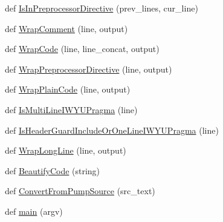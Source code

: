 \begin{DoxyCompactItemize}
\item 
def \mbox{\hyperlink{namespacegoogletest-master_1_1googletest_1_1scripts_1_1pump_ab5f2255303d60f6b7b5b4d2512c588be}{Is\+In\+Preprocessor\+Directive}} (prev\+\_\+lines, cur\+\_\+line)
\item 
def \mbox{\hyperlink{namespacegoogletest-master_1_1googletest_1_1scripts_1_1pump_a4b20aced378c37e54acb7d5aff578c4d}{Wrap\+Comment}} (line, output)
\item 
def \mbox{\hyperlink{namespacegoogletest-master_1_1googletest_1_1scripts_1_1pump_a7f71749d88261af88a8458ef0d4644d5}{Wrap\+Code}} (line, line\+\_\+concat, output)
\item 
def \mbox{\hyperlink{namespacegoogletest-master_1_1googletest_1_1scripts_1_1pump_a0b2798bac4eb00d18ba9984569a19793}{Wrap\+Preprocessor\+Directive}} (line, output)
\item 
def \mbox{\hyperlink{namespacegoogletest-master_1_1googletest_1_1scripts_1_1pump_a442d8c63e9bfec53e0802ae7ee4c2516}{Wrap\+Plain\+Code}} (line, output)
\item 
def \mbox{\hyperlink{namespacegoogletest-master_1_1googletest_1_1scripts_1_1pump_aafe6ed37e1501cfcc2a4c6189d77b382}{Is\+Multi\+Line\+I\+W\+Y\+U\+Pragma}} (line)
\item 
def \mbox{\hyperlink{namespacegoogletest-master_1_1googletest_1_1scripts_1_1pump_afd21629e499fb8ba3108318ff7bb6555}{Is\+Header\+Guard\+Include\+Or\+One\+Line\+I\+W\+Y\+U\+Pragma}} (line)
\item 
def \mbox{\hyperlink{namespacegoogletest-master_1_1googletest_1_1scripts_1_1pump_abc972428be28e7de22c3e8b860e1058b}{Wrap\+Long\+Line}} (line, output)
\item 
def \mbox{\hyperlink{namespacegoogletest-master_1_1googletest_1_1scripts_1_1pump_ace5c606a1b5b7e11c1ea00921021b461}{Beautify\+Code}} (string)
\item 
def \mbox{\hyperlink{namespacegoogletest-master_1_1googletest_1_1scripts_1_1pump_aa5b7fd91e17856b15706074ec13699a0}{Convert\+From\+Pump\+Source}} (src\+\_\+text)
\item 
def \mbox{\hyperlink{namespacegoogletest-master_1_1googletest_1_1scripts_1_1pump_a30ea327c8d3781c9a2b2857a83573094}{main}} (argv)
\end{DoxyCompactItemize}
